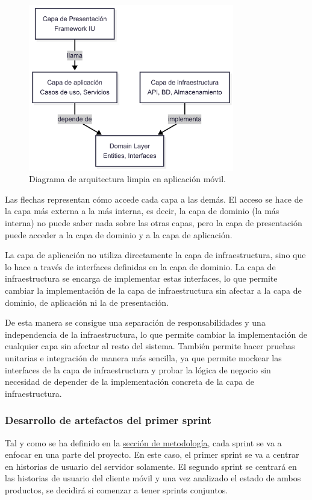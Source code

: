 \begin{figure}[H]
  \centering
  \includegraphics[width=0.8\textwidth]{assets/clean-architecture-mobile.png}
  \caption{Diagrama de arquitectura limpia en aplicación móvil.}
  \label{fig:clean-architecture-mobile}
\end{figure}

Las flechas representan cómo accede cada capa a las demás.
El acceso se hace de la capa más externa a la más interna, es decir, la capa de dominio (la más interna) no puede saber nada sobre las otras capas, pero la capa de presentación puede acceder a la capa de dominio y a la capa de aplicación.

La capa de aplicación no utiliza directamente la capa de infraestructura, sino que lo hace a través de interfaces definidas en la capa de dominio. La capa de infraestructura se encarga de implementar estas interfaces, lo que permite cambiar la implementación de la capa de infraestructura sin afectar a la capa de dominio, de aplicación ni la de presentación.

De esta manera se consigue una separación de responsabilidades y una independencia de la infraestructura, lo que permite cambiar la implementación de cualquier capa sin afectar al resto del sistema.
También permite hacer pruebas unitarias e integración de manera más sencilla, ya que permite \gls{mockear} las interfaces de la capa de infraestructura y probar la lógica de negocio sin necesidad de depender de la implementación concreta de la capa de infraestructura.

\subsubsection{Desarrollo de artefactos del primer sprint}
Tal y como se ha definido en la \hyperref[sec:metodologia]{sección de metodología}, cada sprint se va a enfocar en una parte del proyecto. En este caso, el primer sprint se va a centrar en historias de usuario del servidor solamente. El segundo sprint se centrará en las historias de usuario del cliente móvil y una vez analizado el estado de ambos productos, se decidirá si comenzar a tener sprints conjuntos.

